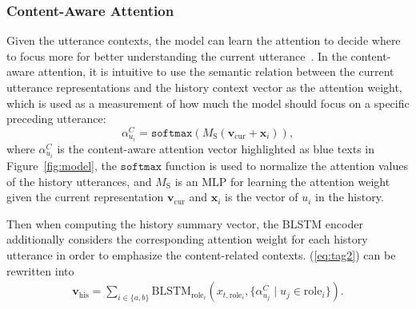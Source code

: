 \documentclass{article}
\begin{document}
\subsubsection{Content-Aware Attention}
Given the utterance contexts, the model can learn the attention to decide where to focus more for better understanding the current utterance~\cite{weston2015memory,chen2016end}.
In the content-aware attention, it is intuitive to use the semantic relation between the current utterance representations and the history context vector as the attention weight, which
is used as a measurement of how much the model should focus on a specific preceding utterance:
\begin{equation}
\label{eq:att_c}
\alpha^C_{u_i} = \mathtt{softmax}(M_{\text{S}}(\textbf{v}_\text{cur} + \textbf{x}_i)),
\end{equation}
where $\alpha^C_{u_i}$ is the content-aware attention vector highlighted as blue texts in Figure~\ref{fig:model}, the $\mathtt{softmax}$ function is used to normalize the attention values of the history utterances, and $M_\text{S}$ is an MLP for learning the attention weight given the current representation $\textbf{v}_\text{cur}$ and $\textbf{x}_i$ is the vector of $u_i$ in the history. 

Then when computing the history summary vector, the BLSTM encoder additionally considers the corresponding attention weight for each history utterance in order to emphasize the content-related contexts.
(\ref{eq:tag2}) can be rewritten into
\begin{eqnarray}
\label{eq:his_att_c}
\textbf{v}_\text{his} = \sum_{i\in \{a,b\}} \text{BLSTM}_{\text{role}_i}(x_{t,\text{role}_i}, \{ \alpha^C_{u_j} \mid u_j \in \text{role}_i\}).
\end{eqnarray}
\end{document}
